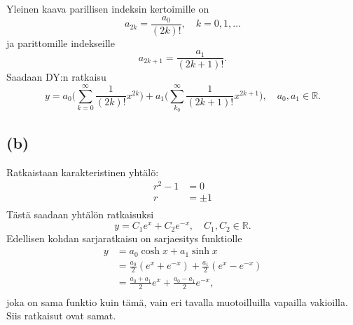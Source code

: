 \documentclass{article}
\begin{document}
Yleinen kaava parillisen indeksin kertoimille on
\[
  a_{2k} = \frac{a_0}{(2k)!}, \quad k = 0,1,\dots
\]
ja parittomille indekseille
\[
  a_{2k+1} = \frac{a_1}{(2k+1)!}.
\]
Saadaan DY:n ratkaisu
\[
  y = a_0\Big(\sum_{k=0}^{\infty}\frac{1}{(2k)!}x^{2k}\Big)
  + a_1\Big(\sum_{k_0}^{\infty}\frac{1}{(2k+1)!}x^{2k+1}\Big), \quad a_0,a_1 \in \mathbb{R}.
\]

\subsection*{(b)}

Ratkaistaan karakteristinen yhtälö:
\begin{align*}
  r^2 - 1 &= 0 \\
  r &= \pm 1 \\
\end{align*}
Tästä saadaan yhtälön ratkaisuksi
\[
  y = C_1e^{x} + C_2e^{-x}, \quad C_1,C_2 \in \mathbb{R}.
\]
Edellisen kohdan sarjaratkaisu on sarjaesitys funktiolle
\begin{align*}
  y &= a_0\cosh x + a_1\sinh x \\
    &= \frac{a_0}{2}(e^x + e^{-x}) + \frac{a_1}{2}(e^x - e^{-x}) \\
    &= \frac{a_0 + a_1}{2}e^x + \frac{a_0 - a_1}{2}e^{-x}, \\
\end{align*}
joka on sama funktio kuin tämä, vain eri tavalla muotoilluilla vapailla
vakioilla. Siis ratkaisut ovat samat.
\end{document}
